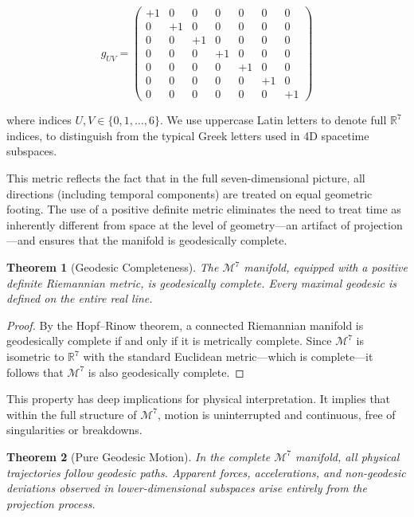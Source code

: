 \documentclass{article}
\newtheorem{theorem}{Theorem}
\begin{document}
\begin{equation}
g_{UV} = \begin{pmatrix}
+1& 0 & 0 & 0 & 0 & 0 & 0 \\
0 & +1 & 0 & 0 & 0 & 0 & 0 \\
0 & 0 & +1 & 0 & 0 & 0 & 0 \\
0 & 0 & 0 & +1 & 0 & 0 & 0 \\
0 & 0 & 0 & 0 & +1 & 0 & 0 \\
0 & 0 & 0 & 0 & 0 & +1 & 0 \\
0 & 0 & 0 & 0 & 0 & 0 & +1
\end{pmatrix}
\end{equation}

\noindent where indices $U, V \in \{0, 1, \dots, 6\}$. We use uppercase Latin letters to denote full $\mathbb{R}^7$ indices, to distinguish from the typical Greek letters used in 4D spacetime subspaces.

This metric reflects the fact that in the full seven-dimensional picture, all directions (including temporal components) are treated on equal geometric footing. The use of a positive definite metric eliminates the need to treat time as inherently different from space at the level of geometry—an artifact of projection—and ensures that the manifold is geodesically complete.

\begin{theorem}[Geodesic Completeness]
The $\mathcal{M}^7$ manifold, equipped with a positive definite Riemannian metric, is geodesically complete. Every maximal geodesic is defined on the entire real line.
\end{theorem}

\begin{proof}
By the Hopf–Rinow theorem, a connected Riemannian manifold is geodesically complete if and only if it is metrically complete. Since $\mathcal{M}^7$ is isometric to $\mathbb{R}^7$ with the standard Euclidean metric—which is complete—it follows that $\mathcal{M}^7$ is also geodesically complete.
\end{proof}

This property has deep implications for physical interpretation. It implies that within the full structure of $\mathcal{M}^7$, motion is uninterrupted and continuous, free of singularities or breakdowns.

\begin{theorem}[Pure Geodesic Motion]
In the complete $\mathcal{M}^7$ manifold, all physical trajectories follow geodesic paths. Apparent forces, accelerations, and non-geodesic deviations observed in lower-dimensional subspaces arise entirely from the projection process.
\end{theorem}
\end{document}
